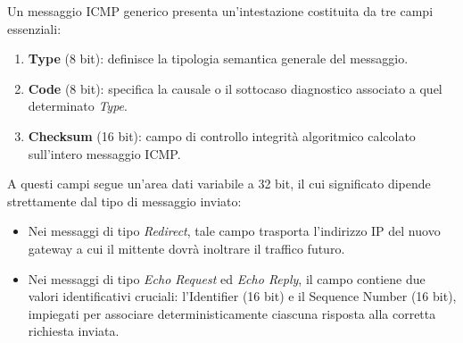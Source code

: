 \documentclass[11pt, a4paper]{article}
\begin{document}

Un messaggio ICMP generico presenta un'intestazione costituita da tre campi essenziali:
\begin{enumerate}
    \item \textbf{Type} (8 bit): definisce la tipologia semantica generale del messaggio.
    \item \textbf{Code} (8 bit): specifica la causale o il sottocaso diagnostico associato a quel determinato \emph{Type}.
    \item \textbf{Checksum} (16 bit): campo di controllo integrità algoritmico calcolato sull'intero messaggio ICMP.
\end{enumerate}
A questi campi segue un'area dati variabile a 32 bit, il cui significato dipende strettamente dal tipo di messaggio inviato:
\begin{itemize}
    \item Nei messaggi di tipo \emph{Redirect}, tale campo trasporta l'indirizzo IP del nuovo gateway a cui il mittente dovrà inoltrare il traffico futuro.
    \item Nei messaggi di tipo \emph{Echo Request} ed \emph{Echo Reply}, il campo contiene due valori identificativi cruciali: l'Identifier (16 bit) e il Sequence Number (16 bit), impiegati per associare deterministicamente ciascuna risposta alla corretta richiesta inviata.
\end{itemize}
\end{document}
